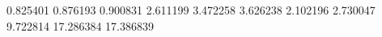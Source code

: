 0.825401
0.876193
0.900831
2.611199
3.472258
3.626238
2.102196
2.730047
9.722814
17.286384
17.386839
